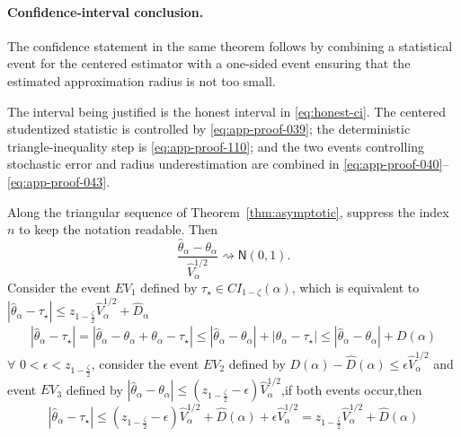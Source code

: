 \documentclass[11pt]{article}
\numberwithin{equation}{section}
\newcommand{\1}{\mathbf 1}
\newcommand{\abs}[1]{\left\lvert #1\right\rvert}
\newcommand{\Normal}{\mathsf N}
\begin{document}
\paragraph{Confidence-interval conclusion.} The confidence statement in the
same theorem follows by combining a statistical event for the centered
estimator with a one-sided event ensuring that the estimated approximation
radius is not too small.

The interval being justified is the honest interval in
\eqref{eq:honest-ci}.  The centered studentized statistic is controlled by
\eqref{eq:app-proof-039}; the deterministic triangle-inequality step is
\eqref{eq:app-proof-110}; and the two events controlling stochastic error and
radius underestimation are combined in \eqref{eq:app-proof-040}--
\eqref{eq:app-proof-043}.

Along the triangular sequence of Theorem~\ref{thm:asymptotic}, suppress the index \(n\) to keep the notation readable.  Then
\begin{equation}
\label{eq:app-proof-039}
\frac{\widehat\theta_\alpha-\theta_\alpha}{\widehat V_\alpha^{1/2}}
  \rightsquigarrow \Normal(0,1).
\end{equation}
Consider the event \(EV_1\) defined by \(\tau_\star \in CI_{1-\zeta}(\alpha)\), which is equivalent to \(\abs{\widehat\theta_{\alpha}-\tau_{\star}}\leq z_{1-\frac{\zeta}2}\widehat V_{\alpha}^{1/2}+\widehat D_{\alpha}\)
\begin{equation}
\label{eq:app-proof-110}
\begin{aligned}
\abs{\widehat\theta_{\alpha}-\tau_{\star}}
=\abs{\widehat\theta_{\alpha}-\theta_{\alpha}+\theta_{\alpha}-\tau_{\star}}
\leq \abs{\widehat\theta_{\alpha}-\theta_{\alpha}}+\abs{\theta_{\alpha}-\tau_{\star}}
\leq \abs{\widehat\theta_{\alpha}-\theta_{\alpha}}+D(\alpha)
\end{aligned}
\end{equation}
\(\forall\,\,0<\epsilon<z_{1-\frac{\zeta}2}\), consider the event \(EV_2\) defined by \(D(\alpha)-\widehat D(\alpha)\leq \epsilon \widehat V_{\alpha}^{1/2}\) and event \(EV_3\) defined by \(\abs{\widehat\theta_{\alpha}-\theta_{\alpha}}\leq (z_{1-\frac{\zeta}2}-\epsilon)\widehat V_{\alpha}^{1/2}\),if both events occur,then
\begin{equation}
\label{eq:app-proof-040}
\abs{\widehat\theta_{\alpha}-\tau_{\star}}\leq 
(z_{1-\frac{\zeta}2}-\epsilon)\widehat V_{\alpha}^{1/2}+\widehat D(\alpha)+\epsilon \widehat V_{\alpha}^{1/2}=z_{1-\frac{\zeta}2} \widehat V_{\alpha}^{1/2}+\widehat D(\alpha)
\end{equation}
\end{document}
